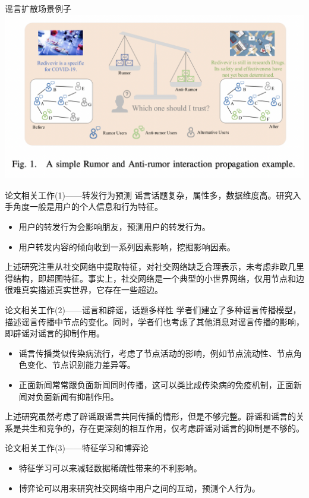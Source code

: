 \documentclass{beamer}
\begin{document}
\begin{frame}{谣言扩散场景例子}
	\includegraphics[width=\linewidth]{Assets/图1}
\end{frame}

\begin{frame}{论文相关工作(1)——转发行为预测}
	谣言话题复杂，属性多，数据维度高。研究入手角度一般是用户的个人信息和行为特征。
	\begin{itemize}
		\item 用户的转发行为会影响朋友，预测用户的转发行为。
		\item 用户转发内容的倾向收到一系列因素影响，挖掘影响因素。
	\end{itemize}
	上述研究注重从社交网络中提取特征，对社交网络缺乏合理表示，未考虑非欧几里得结构，即超图特征。事实上，社交网络是一个典型的小世界网络，仅用节点和边很难真实描述真实世界，它存在一些超边。
\end{frame}

\begin{frame}{论文相关工作(2)——谣言和辟谣，话题多样性}
	学者们建立了多种谣言传播模型，描述谣言传播中节点的变化。同时，学者们也考虑了其他消息对谣言传播的影响，即辟谣对谣言的抑制作用。
	\begin{itemize}
		\item 谣言传播类似传染病流行，考虑了节点活动的影响，例如节点流动性、节点角色变化、节点识别能力差异等。
		\item 正面新闻常常跟负面新闻同时传播，这可以类比成传染病的免疫机制，正面新闻对负面新闻有抑制作用。
	\end{itemize}
	上述研究虽然考虑了辟谣跟谣言共同传播的情形，但是不够完整。辟谣和谣言的关系是共生和竞争的，存在更深刻的相互作用，仅考虑辟谣对谣言的抑制是不够的。
\end{frame}

\begin{frame}{论文相关工作(3)——特征学习和博弈论}
	\begin{itemize}
		\item 特征学习可以来减轻数据稀疏性带来的不利影响。
		\item 博弈论可以用来研究社交网络中用户之间的互动，预测个人行为。
	\end{itemize}
\end{frame}
\end{document}
